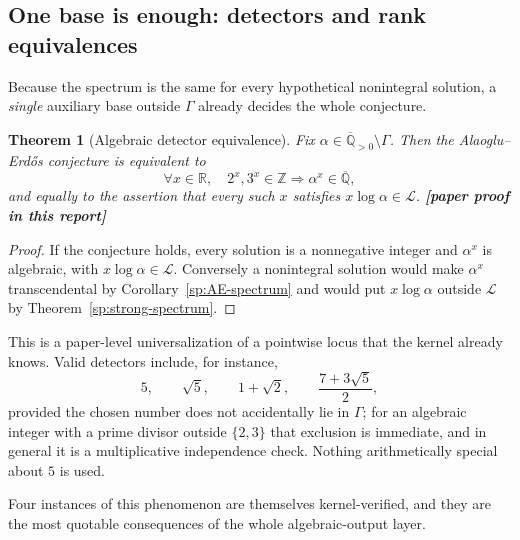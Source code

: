 \documentclass[11pt,oneside]{article}
\newtheorem{theorem}{Theorem}[section]
\theoremstyle{definition}
\theoremstyle{remark}
\newcommand{\Z}{\mathbb Z}
\newcommand{\R}{\mathbb R}
\newcommand{\Abar}{\overline{\mathbb Q}}
\newcommand{\Apos}{\Abar_{>0}}
\newcommand{\LL}{\mathcal L}
\newcommand{\GammaSat}{\Gamma}
\newcommand{\Qbar}{\Abar}
\newcommand{\statusnew}{\textcolor{newgreen}{\textbf{[paper proof in this report]}}}
\begin{document}
\subsection{One base is enough: detectors and rank equivalences}

Because the spectrum is the same for every hypothetical nonintegral solution, a
\emph{single} auxiliary base outside $\GammaSat$ already decides the whole conjecture.

\begin{theorem}[Algebraic detector equivalence]\label{sp:detector}
Fix $\alpha\in\Apos\setminus\GammaSat$.  Then the Alaoglu--Erd\H{o}s conjecture is equivalent
to
\[
  \forall x\in\R,\quad 2^{x},3^{x}\in\Z\Longrightarrow \alpha^{x}\in\Qbar,
\]
and equally to the assertion that every such $x$ satisfies $x\log\alpha\in\LL$.  \statusnew
\end{theorem}

\begin{proof}
If the conjecture holds, every solution is a nonnegative integer and $\alpha^{x}$ is
algebraic, with $x\log\alpha\in\LL$.  Conversely a nonintegral solution would make
$\alpha^{x}$ transcendental by Corollary~\ref{sp:AE-spectrum} and would put $x\log\alpha$
outside $\LL$ by Theorem~\ref{sp:strong-spectrum}.
\end{proof}

This is a paper-level universalization of a pointwise locus that the kernel already knows.
Valid detectors include, for instance,
\[
  5,\qquad \sqrt5,\qquad 1+\sqrt2,\qquad \frac{7+3\sqrt5}{2},
\]
provided the chosen number does not accidentally lie in $\GammaSat$; for an algebraic integer
with a prime divisor outside $\{2,3\}$ that exclusion is immediate, and in general it is a
multiplicative independence check.  Nothing arithmetically special about $5$ is used.

Four instances of this phenomenon are themselves kernel-verified, and they are the most
quotable consequences of the whole algebraic-output layer.
\end{document}
